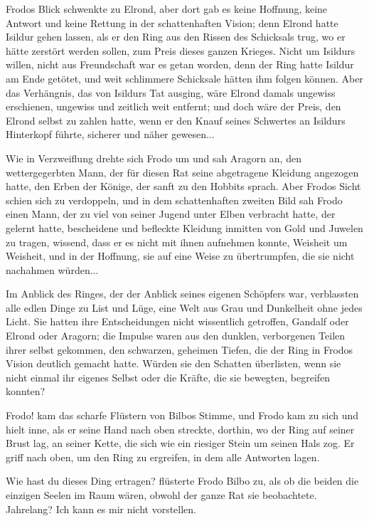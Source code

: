 Frodos Blick schwenkte zu Elrond, aber dort gab es keine Hoffnung, keine Antwort
und keine Rettung in der schattenhaften Vision; denn Elrond hatte Isildur gehen
lassen, als er den Ring aus den Rissen des Schicksals trug, wo er hätte zerstört
werden sollen, zum Preis dieses ganzen Krieges. Nicht um Isildurs willen, nicht
aus Freundschaft war es getan worden, denn der Ring hatte Isildur am Ende
getötet, und weit schlimmere Schicksale hätten ihm folgen können. Aber das
Verhängnis, das von Isildurs Tat ausging, wäre Elrond damals ungewiss
erschienen, ungewiss und zeitlich weit entfernt; und doch wäre der Preis, den
Elrond selbst zu zahlen hatte, wenn er den Knauf seines Schwertes an Isildurs
Hinterkopf führte, sicherer und näher gewesen...

Wie in Verzweiflung drehte sich Frodo um und sah Aragorn an, den wettergegerbten
Mann, der für diesen Rat seine abgetragene Kleidung angezogen hatte, den Erben
der Könige, der sanft zu den Hobbits sprach. Aber Frodos Sicht schien sich zu
verdoppeln, und in dem schattenhaften zweiten Bild sah Frodo einen Mann, der zu
viel von seiner Jugend unter Elben verbracht hatte, der gelernt hatte,
bescheidene und befleckte Kleidung inmitten von Gold und Juwelen zu tragen,
wissend, dass er es nicht mit ihnen aufnehmen konnte, Weisheit um Weisheit, und
in der Hoffnung, sie auf eine Weise zu übertrumpfen, die sie nicht nachahmen
würden...

Im Anblick des Ringes, der der Anblick seines eigenen Schöpfers war, verblassten
alle edlen Dinge zu List und Lüge, eine Welt aus Grau und Dunkelheit ohne jedes
Licht. Sie hatten ihre Entscheidungen nicht wissentlich getroffen, Gandalf oder
Elrond oder Aragorn; die Impulse waren aus den dunklen, verborgenen Teilen ihrer
selbst gekommen, den schwarzen, geheimen Tiefen, die der Ring in Frodos Vision
deutlich gemacht hatte. Würden sie den Schatten überlisten, wenn sie nicht
einmal ihr eigenes Selbst oder die Kräfte, die sie bewegten, begreifen konnten?

\glqq Frodo!\grqq{} kam das scharfe Flüstern von Bilbos Stimme, und Frodo kam zu
sich und hielt inne, als er seine Hand nach oben streckte, dorthin, wo der Ring
auf seiner Brust lag, an seiner Kette, die sich wie ein riesiger Stein um seinen
Hals zog. Er griff nach oben, um den Ring zu ergreifen, in dem alle Antworten
lagen.

\glqq Wie hast du dieses Ding ertragen?\grqq{} flüsterte Frodo Bilbo zu, als ob
die beiden die einzigen Seelen im Raum wären, obwohl der ganze Rat sie
beobachtete. \glqq Jahrelang? Ich kann es mir nicht vorstellen.\grqq{}

